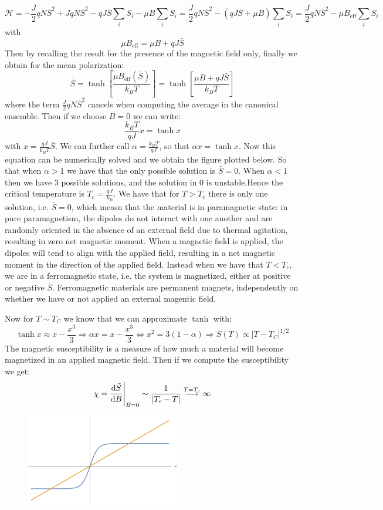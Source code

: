 \documentclass[10pt,a4paper]{book}
\begin{document}
\[
\mathcal{H} = -\frac{J}{2}qN\bar{S}^2+JqN\bar{S}^2-qJ\bar{S}\sum_i S_i-\mu B\sum_i S_i=
\frac{J}{2} q N \bar{S}^2 - (q J \bar{S} + \mu B)\sum_i S_i=\frac{J}{2}qN\bar{S}^2 -\mu B_{\text{eff}}\sum_i S_i
\]
with 
\[
\mu B_\text{eff} = \mu B + q J \bar{S}
\]
Then by recalling the result for the presence of the magnetic field only, finally we obtain for the mean polarization:
\[
\bar{S} = \tanh\left[\frac{\mu B_\text{eff}(\bar{S})}{k_B T}\right]= \tanh\left[\frac{\mu B + q J \bar{S}}{k_B T}\right]
\]
where the term $\frac{J}{2}qN\bar{S}^2$ cancels when computing the average in the canonical ensemble.
Then if we choose $B=0$ we can write:
\[
\frac{k_B T}{q J} x = \tanh x
\]
with $x=\frac{qJ}{k_BT}\bar{S}$. We can further call $\alpha =\frac{k_B T}{qJ}$, so that $\alpha x=\tanh{x}$.
Now this equation can be numerically solved and we obtain the figure plotted below.
So that when $\alpha > 1$ we have that the only possible solution is $\bar{S} = 0$. When $\alpha < 1$ then we have 3 possible solutions, and the solution in 0 is unstable.Hence the critical temperature is $T_c=\frac{qJ}{k_B}$. We have that for $T>T_c$ there is only one solution, i.e. $\bar{S}=0$, which measn that the material is in paramagnetic state: in pure paramagnetism, the dipoles do not interact with one another and are randomly oriented in the absence of an external field due to thermal agitation, resulting in zero net magnetic moment. When a magnetic field is applied, the dipoles will tend to align with the applied field, resulting in a net magnetic moment in the direction of the applied field. Instead when we have that $T<T_c$, we are in a ferromagnetic state, i.e. the system is magnetized, either at positive or negative $\bar{S}$. Ferromagnetic materials are permanent magnets, independently on whether we have or not applied an external magentic field.


Now for $T \sim T_C$ we know that we can approximate $\tanh$ with:
\[
\tanh x \approx x - \frac{x^3}{3} \Rightarrow \alpha x = x - \frac{x^3}{3} \Leftrightarrow x^2 = 3(1 - \alpha) \Rightarrow S(T) \propto |T - T_C|^{1/2}
\]
The magnetic susceptibility is a measure of how much a material will become magnetized in an applied magnetic field.
Then if we compute the susceptibility we get:
\[
\chi = \dv{\bar{S}}{B}\Bigg|_{B = 0} \sim \frac{1}{|T_c - T|} \stackrel{T = T_c}{\longrightarrow} \infty
\]
\begin{figure}[h!]
\centering
\includegraphics[width = 0.6\textwidth]{graphs/TanhLin_Cut}
\end{figure}
\end{document}
